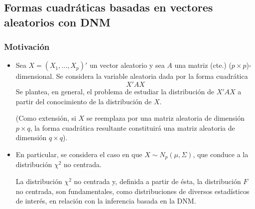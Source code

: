 \documentclass[11pt,a4paper]{article}
\begin{document}
\subsection{Formas cuadráticas basadas en vectores aleatorios con DNM}

\subsubsection{Motivación}
\begin{itemize}
\item Sea $X = (X_{1}, \dots, X_{p})'$ un vector aleatorio y sea $A$ una matriz (cte.) ($p \times p$)-dimensional. Se considera la variable aleatoria dada por la forma cuadrática
$$X'AX$$
Se plantea, en general, el problema de estudiar la distribución de $X'AX$ a partir del conocimiento de la distribución de $X$.

(Como extensión, si $X$ se reemplaza por una matriz aleatoria de dimensión $p \times q$, la forma cuadrática resultante constituirá una matriz aleatoria de dimensión $q \times q$).

\item En particular, se considera el caso en que $X \sim N_{p}(\mu, \Sigma)$, que conduce a la distribución $\chi^{2}$ no centrada.

La distribución $\chi^{2}$ no centrada y, definida a partir de ésta, la distribución $F$ no centrada, son fundamentales, como distribuciones de diversos estadísticos de interés, en relación con la inferencia basada en la DNM.
\end{itemize}
\end{document}
